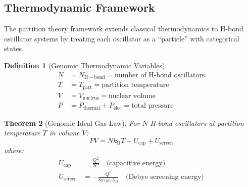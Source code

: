 \documentclass[twocolumn,10pt]{article}
\newtheorem{theorem}{Theorem}[section]
\newtheorem{definition}[theorem]{Definition}
\theoremstyle{remark}
\newcommand{\kB}{k_{\mathrm{B}}}
\begin{document}
\subsection{Thermodynamic Framework}

The partition theory framework extends classical thermodynamics to H-bond oscillator systems by treating each oscillator as a ``particle'' with categorical states.

\begin{definition}[Genomic Thermodynamic Variables]
\begin{align}
N &= N_{\mathrm{H-bond}} = \text{number of H-bond oscillators} \\
T &= T_{\mathrm{part}} = \text{partition temperature} \\
V &= V_{\mathrm{nucleus}} = \text{nuclear volume} \\
P &= P_{\mathrm{thermal}} + P_{\mathrm{elec}} = \text{total pressure}
\end{align}
\end{definition}

\begin{theorem}[Genomic Ideal Gas Law]
\label{thm:ideal_gas}
For $N$ H-bond oscillators at partition temperature $T$ in volume $V$:
\begin{equation}
PV = N\kB T + U_{\mathrm{cap}} + U_{\mathrm{screen}}
\end{equation}
where:
\begin{align}
U_{\mathrm{cap}} &= \frac{Q^2}{2C} \quad \text{(capacitive energy)} \\
U_{\mathrm{screen}} &= -\frac{Q^2}{8\pi\varepsilon_0\varepsilon_r\lambda_D} \quad \text{(Debye screening energy)}
\end{align}
\end{theorem}
\end{document}

